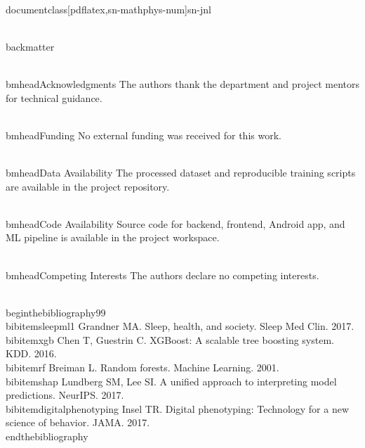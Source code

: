 \\documentclass[pdflatex,sn-mathphys-num]{sn-jnl}
\begin{document}
\\backmatter

\\bmhead{Acknowledgments}
The authors thank the department and project mentors for technical guidance.

\\bmhead{Funding}
No external funding was received for this work.

\\bmhead{Data Availability}
The processed dataset and reproducible training scripts are available in the project repository.

\\bmhead{Code Availability}
Source code for backend, frontend, Android app, and ML pipeline is available in the project workspace.

\\bmhead{Competing Interests}
The authors declare no competing interests.

\\begin{thebibliography}{99}
\\bibitem{sleepml1} Grandner MA. Sleep, health, and society. Sleep Med Clin. 2017.
\\bibitem{xgb} Chen T, Guestrin C. XGBoost: A scalable tree boosting system. KDD. 2016.
\\bibitem{rf} Breiman L. Random forests. Machine Learning. 2001.
\\bibitem{shap} Lundberg SM, Lee SI. A unified approach to interpreting model predictions. NeurIPS. 2017.
\\bibitem{digitalphenotyping} Insel TR. Digital phenotyping: Technology for a new science of behavior. JAMA. 2017.
\\end{thebibliography}

\
\end{document}
